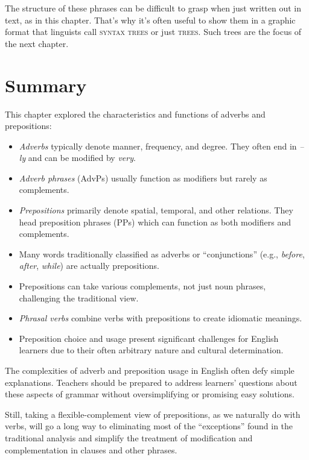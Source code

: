 The structure of these phrases can be difficult to grasp when just written out in text, as in this chapter. That's why it's often useful to show them in a graphic format that linguists call \textsc{syntax trees} or just \textsc{trees}. Such trees are the focus of the next chapter.

\section{Summary}

This chapter explored the characteristics and functions of adverbs and prepositions:

\begin{itemize}
    \item \textit{Adverbs} typically denote manner, frequency, and degree. They often end in \textit{--ly} and can be modified by \textit{very}.
    \item \textit{Adverb phrases} (AdvPs) usually function as modifiers but rarely as complements.
    \item \textit{Prepositions} primarily denote spatial, temporal, and other relations. They head preposition phrases (PPs) which can function as both modifiers and complements.
    \item Many words traditionally classified as adverbs or ``conjunctions'' (e.g., \textit{before}, \textit{after}, \textit{while}) are actually prepositions.
    \item Prepositions can take various complements, not just noun phrases, challenging the traditional view.
    \item \textit{Phrasal verbs} combine verbs with prepositions to create idiomatic meanings.
    \item Preposition choice and usage present significant challenges for English learners due to their often arbitrary nature and cultural determination.
\end{itemize}

The complexities of adverb and preposition usage in English often defy simple explanations. Teachers should be prepared to address learners' questions about these aspects of grammar without oversimplifying or promising easy solutions.

Still, taking a flexible-complement view of prepositions, as we naturally do with verbs, will go a long way to eliminating most of the ``exceptions'' found in the traditional analysis and simplify the treatment of modification and complementation in clauses and other phrases.

